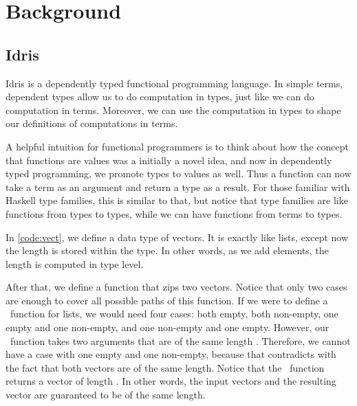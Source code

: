 \chapter{Background}\label{chap:background}

\newcommand{\zip}{\fn{zip}}
\section{Idris}

Idris is a dependently typed functional programming language. In simple terms,
dependent types allow us to do computation in types, just like we can do
computation in terms.\cite{davidphd} Moreover, we can use the computation
in types to shape our definitions of computations in terms.

A helpful intuition for functional programmers is to think about how the
concept that functions are values was a initially a novel idea, and now in
dependently typed programming, we promote types to values as well.
Thus a function can now take a term as an argument and return a type as a
result.\cite{lambdacube,henk}
For those familiar with Haskell type families\cite{typefamilies}, this is
similar to that, but notice that type families are like functions from types to types,
while we can have functions from terms to types.

In \autoref{code:vect}, we define a data type of vectors. It is exactly
like lists, except now the length is stored within the type. In other
words, as we add elements, the length is computed in type level.

After that, we define a function that zips two vectors. Notice that only two
cases are enough to cover all possible paths of this function. If we were to
define a \zip\ function for lists, we would need four cases: both empty, both
non-empty, one empty and one non-empty, and one non-empty and one empty.
However, our \zip\ function takes two arguments that are of the same length
.  Therefore, we cannot have a case with one empty and one non-empty,
because that contradicts with the fact that both vectors are of the same
length. Notice that the \zip\ function returns a vector of length .
In other words, the input vectors and the resulting vector are guaranteed to be
of the same length.


